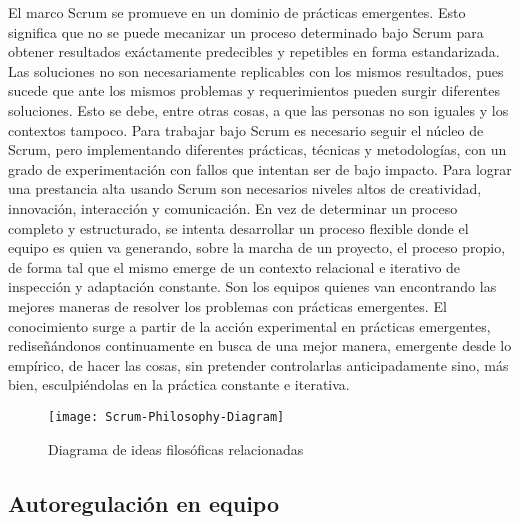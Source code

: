 El marco Scrum se promueve en un dominio de prácticas emergentes. Esto significa que no se puede mecanizar un proceso determinado bajo Scrum para obtener resultados exáctamente predecibles y repetibles en forma estandarizada. Las soluciones no son necesariamente replicables con los mismos resultados, pues sucede que ante los mismos problemas y requerimientos pueden surgir diferentes soluciones. Esto se debe, entre otras cosas, a que las personas no son iguales y los contextos tampoco. Para trabajar bajo Scrum es necesario seguir el núcleo de Scrum, pero implementando diferentes prácticas, técnicas y metodologías, con un grado de experimentación con fallos que intentan ser de bajo impacto. Para lograr una prestancia alta usando Scrum son necesarios niveles altos de creatividad, innovación, interacción y comunicación. En vez de determinar un proceso completo y estructurado, se intenta desarrollar un proceso flexible donde el equipo es quien va generando, sobre la marcha de un proyecto, el proceso propio, de forma tal que el mismo emerge de un contexto relacional e iterativo de inspección y adaptación constante. Son los equipos quienes van encontrando las mejores maneras de resolver los problemas con prácticas emergentes. El conocimiento surge a partir de la acción experimental en prácticas emergentes, rediseñándonos continuamente en busca de una mejor manera, emergente desde lo empírico, de hacer las cosas, sin pretender controlarlas anticipadamente sino, más bien, esculpiéndolas en la práctica constante e iterativa.

\begin{figure}[h] 
  \centering
  \texttt{[image: Scrum-Philosophy-Diagram]}
  \caption{Diagrama de ideas filosóficas relacionadas}
  \centering
  \label{fig:Scrum-Philosophy-Diagram} %
\end{figure}



\subsection{Autoregulación en equipo}

